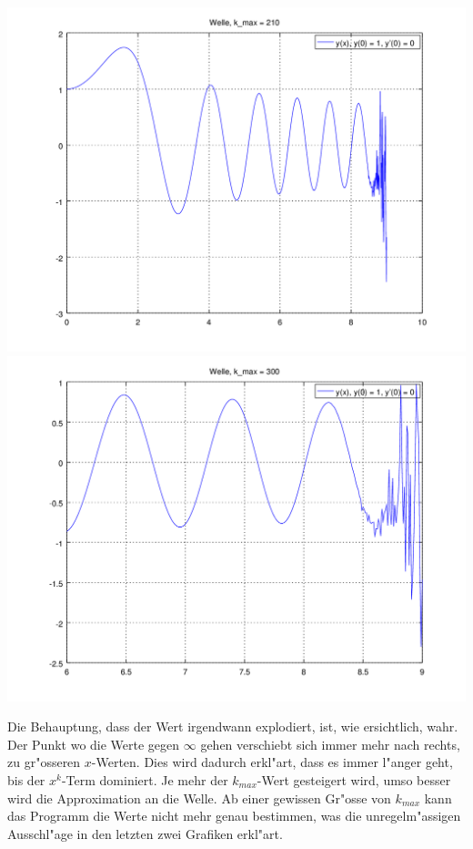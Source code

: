 \begin{refsection}
\includegraphics[scale=0.35]{./wellen/octave/images/kmax/ak210wave.png}
\includegraphics[scale=0.35]{./wellen/octave/images/kmax/ak300wave.png}

Die Behauptung, dass der Wert irgendwann explodiert, ist, wie ersichtlich, 
wahr. Der Punkt wo die Werte gegen $\infty$ gehen verschiebt sich immer mehr 
nach rechts, zu gr"osseren $x$-Werten. Dies wird dadurch erkl"art, dass es 
immer l"anger geht, bis der $x^k$-Term dominiert. Je mehr der $k_{max}$-Wert 
gesteigert wird, umso besser wird die Approximation an die Welle. Ab einer 
gewissen Gr"osse von $k_{max}$ kann das Programm die Werte nicht mehr genau 
bestimmen, was die unregelm"assigen Ausschl"age in den letzten zwei Grafiken 
erkl"art.


\end{refsection}
